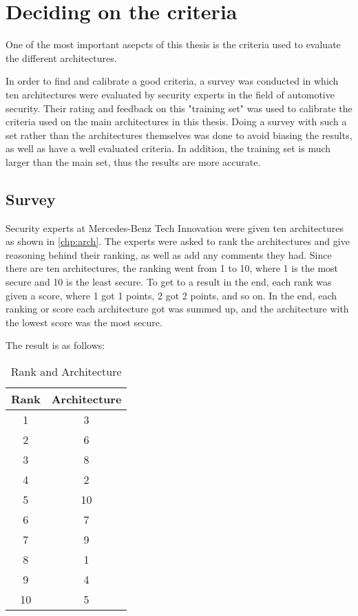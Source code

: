 \chapter{Deciding on the criteria}
\label{chp:criteria}

One of the most important asepcts of this thesis is the criteria used to evaluate the different architectures.

In order to find and calibrate a good criteria, a survey was conducted in which ten architectures were evaluated by security experts in the field of automotive security.
Their rating and feedback on this "training set" was used to calibrate the criteria used on the main architectures in this thesis.
Doing a survey with such a set rather than the architectures themselves was done to avoid biasing the results, as well as have a well evaluated criteria.
In addition, the training set is much larger than the main set, thus the results are more accurate.

\section{Survey}
\label{sec:survey}

Security experts at Mercedes-Benz Tech Innovation were given ten architectures as shown in \ref{chp:arch}.
The experts were asked to rank the architectures and give reasoning behind their ranking, as well as add any comments they had.
Since there are ten architectures, the ranking went from 1 to 10, where 1 is the most secure and 10 is the least secure.
To get to a result in the end, each rank was given a score, where 1 got 1 points, 2 got 2 points, and so on.
In the end, each ranking or score each architecture got was summed up, and the architecture with the lowest score was the most secure.

The result is as follows:

\begin{table}[h]
    \centering
    \caption{Rank and Architecture}
    \begin{tabular}{ |c|c| } 
    \hline
    Rank & Architecture \\
    \hline
    1 & 3 \\
    2 & 6 \\
    3 & 8 \\
    4 & 2 \\
    5 & 10 \\
    6 & 7 \\
    7 & 9 \\
    8 & 1 \\
    9 & 4 \\
    10 & 5 \\
    \hline
    \end{tabular}
\end{table}

